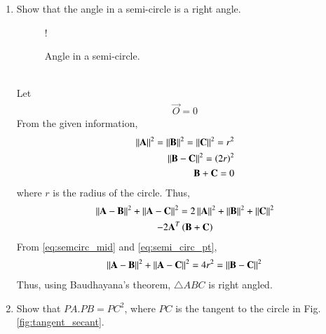 \begin{enumerate}[label=\arabic*.,ref=\thesubsection.\theenumi]
\item Show that the angle in a semi-circle is a right angle.
\begin{figure}[!h]
\centering
\resizebox {\columnwidth} {!} {

}
\caption{Angle in a semi-circle.}
\label{fig:ch2_line}
\end{figure}
\\
\solution Let 
\begin{align}
\vec{O} = 0
\end{align}
From the given information,
\begin{align}
\label{eq:semi_circ_pt}
\left\lVert\mathbf{A}\right\rVert^2 = \left\lVert\mathbf{B}\right\rVert^2 = \left\lVert\mathbf{C}\right\rVert^2 = r^2
\\
\left\lVert\mathbf{B}-\mathbf{C}\right\rVert^2 =  \left(2r\right)^2
\\
\mathbf{B} + \mathbf{C} = 0
\label{eq:semcirc_mid}
\end{align}
%
where $r$ is the radius of the circle. Thus,
\begin{multline}
\left\lVert\mathbf{A}-\mathbf{B}\right\rVert^2 + \left\lVert\mathbf{A}-\mathbf{C}\right\rVert^2 = 
2\left\lVert\mathbf{A}\right\rVert^2 + \left\lVert\mathbf{B}\right\rVert^2 + \left\lVert\mathbf{C}\right\rVert^2
\\
-2\mathbf{A}^T\left(\mathbf{B}+\mathbf{C}\right)
\end{multline}
From \eqref{eq:semcirc_mid} and \eqref{eq:semi_circ_pt},
\begin{multline}
\left\lVert\mathbf{A}-\mathbf{B}\right\rVert^2 + \left\lVert\mathbf{A}-\mathbf{C}\right\rVert^2 = 4r^2 = \left\lVert\mathbf{B}-\mathbf{C}\right\rVert^2 
\end{multline}
Thus, using Baudhayana's theorem, $\triangle ABC$ is right angled.
\item 	Show that $PA.PB = PC^2$, where $PC$ is the tangent to the circle in Fig. \ref{fig:tangent_secant}.

	\begin{figure}[!hb]
		\begin{center}
			

\end{center}
\end{figure}
\end{enumerate}
